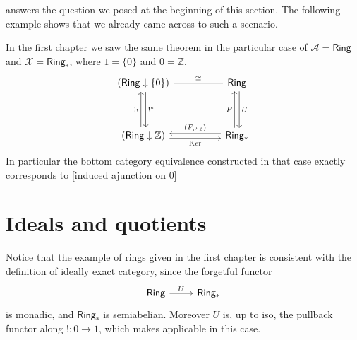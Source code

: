  answers the question we posed at the beginning of this section. The following example shows that we already came across to such a scenario.

\begin{rembox}{}
    \begin{ex}
In the first chapter we saw the same theorem in the particular case of $\mathcal{A}=\mathsf{Ring}$ and $\mathcal{X}=\mathsf{Ring_*}$, where $1=\{0\}$ and $0=\mathbb{Z}$. 
\[
\begin{tikzcd}
(\mathsf{Ring} \downarrow \{0\}) \arrow[dd, "!^*", shift left] \arrow[rr, "\cong", no head]                       &  & \mathsf{Ring} \arrow[dd, "U", shift left]                                                    \\
                                                                                                              &  &                                                                                              \\
 (\mathsf{Ring} \downarrow \mathbb{Z}) \arrow[uu, "!_!", shift left] \arrow[rr, "\mathrm{Ker}"', shift right] &  & \mathsf{Ring_*} \arrow[uu, "F", shift left] \arrow[ll, "{(F,\pi_\mathbb{Z})}"', shift right]
\end{tikzcd}
\]
In particular the bottom category equivalence constructed in that case exactly corresponds to \eqref{induced ajunction on 0}
    \end{ex}
\end{rembox}

\section{Ideals and quotients}

Notice that the example of rings given in the first chapter is consistent with the definition of ideally exact category, since the forgetful functor
\[
\begin{tikzcd}
\mathsf{Ring} \arrow[r, "U"] & \mathsf{Ring_*}
\end{tikzcd}
\]
is monadic, and $\mathsf{Ring}_*$ is semiabelian. Moreover $U$ is, up to iso, the pullback functor along $!:0 \to 1$, which makes applicable  in this case. 

